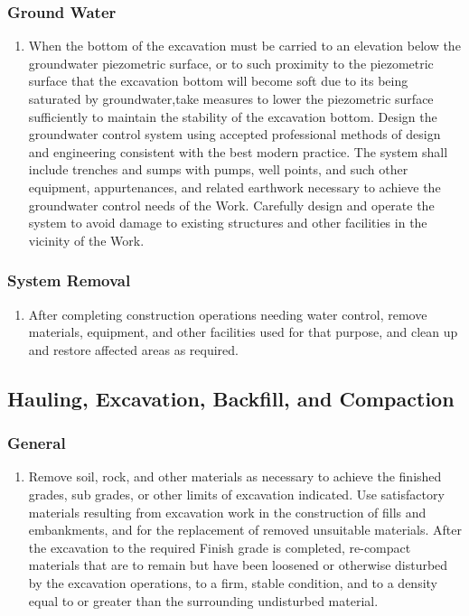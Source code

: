 \documentclass{article}%
\begin{document}
%
\subsubsection{Ground Water}%
\label{ssubsec:GroundWater}%
\begin{enumerate}[label=\alph*),start=1]%
\item%
When the bottom of the excavation must be carried to an elevation below the groundwater piezometric surface, or to such proximity to the piezometric surface that the excavation bottom will become soft due to its being saturated by groundwater,take measures to lower the piezometric surface sufficiently to maintain the stability of the excavation bottom. Design the groundwater control system using accepted professional methods of design and engineering consistent with the best modern practice. The system shall include trenches and sumps with pumps, well points, and such other equipment, appurtenances, and related earthwork necessary to achieve the groundwater control needs of the Work. Carefully design and operate the system to avoid damage to existing structures and other facilities in the vicinity of the Work.%
\end{enumerate}

%
\subsubsection{System Removal}%
\label{ssubsec:SystemRemoval}%
\begin{enumerate}[label=\alph*),start=1]%
\item%
After completing construction operations needing water control, remove materials, equipment, and other facilities used for that purpose, and clean up and restore affected areas as required.%
\end{enumerate}

%
\subsection{Hauling, Excavation, Backfill, and Compaction}%
\label{subsec:Hauling,Excavation,Backfill,andCompaction}%
\subsubsection{General}%
\label{ssubsec:General}%
\begin{enumerate}[label=\alph*),start=1]%
\item%
Remove soil, rock, and other materials as necessary to achieve the finished grades, sub grades, or other limits of excavation indicated. Use satisfactory materials resulting from excavation work in the construction of fills and embankments, and for the replacement of removed unsuitable materials. After the excavation to the required Finish grade is completed, re{-}compact materials that are to remain but have been loosened or otherwise disturbed by the excavation operations, to a firm, stable condition, and to a density equal to or greater than the surrounding undisturbed material.%
\end{enumerate}
\end{document}
